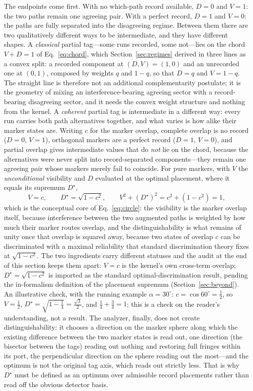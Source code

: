 The endpoints come first. With no which-path record available, $D = 0$ and $V = 1$: the two paths remain one agreeing pair. With a perfect record, $D = 1$ and $V = 0$: the paths are fully separated into the disagreeing regime. Between them there are two qualitatively different ways to be intermediate, and they have different shapes. A \emph{classical} partial tag---some runs recorded, some not---lies on the chord $V + D = 1$ of Eq.~\eqref{eq:chord}, which Section~\ref{sec:regimes} derived in three lines as a convex split: a recorded component at $(D, V) = (1, 0)$ and an unrecorded one at $(0, 1)$, composed by weights $q$ and $1 - q$, so that $D = q$ and $V = 1 - q$. The straight line is therefore not an additional complementarity postulate; it is the geometry of mixing an interference-bearing agreeing sector with a record-bearing disagreeing sector, and it needs the convex weight structure and nothing from the kernel. A \emph{coherent} partial tag is intermediate in a different way: every run carries both path alternatives together, and what varies is how alike their marker states are. Writing $c$ for the marker overlap, complete overlap is no record ($D = 0$, $V = 1$), orthogonal markers are a perfect record ($D = 1$, $V = 0$), and partial overlap gives intermediate values that do \emph{not} lie on the chord, because the alternatives were never split into record-separated components---they remain one agreeing pair whose markers merely fail to coincide. For pure markers, with $V$ the \emph{unconditional} visibility and $D$ evaluated at the optimal placement, where it equals its supremum $D^{\star}$,
\[ V = c, \qquad D^{\star} = \sqrt{1 - c^{2}}, \qquad V^{2} + (D^{\star})^{2} = c^{2} + (1 - c^{2}) = 1, \]
which is the conceptual core of Eq.~\eqref{eq:circle}: the visibility is the marker overlap itself, because interference between the two augmented paths is weighted by how much their marker routes overlap, and the distinguishability is what remains of unity once that overlap is squared away, because two states of overlap $c$ can be discriminated with a maximal reliability that standard discrimination theory fixes at $\sqrt{1 - c^{2}}$. The two ingredients carry different statuses and the audit at the end of this section keeps them apart: $V = c$ is the kernel's own cross-term overlap; $D^{\star} = \sqrt{1 - c^{2}}$ is imported as the standard optimal-discrimination result, pending the in-formalism definition of the placement supremum (Section~\ref{sec:beyond}). An illustrative check, with the running example $\alpha = 30^\circ$: $c = \cos 60^\circ = \tfrac12$, so $V = \tfrac12$, $D^{\star} = \sqrt{1 - \tfrac14} = \tfrac{\sqrt3}{2}$, and $\tfrac14 + \tfrac34 = 1$; this is a check on the reader's understanding, not a result. The analyzer, finally, does not create distinguishability: it chooses a direction on the marker sphere along which the existing difference between the two marker states is read out, one direction (the bisector between the tags) reading out nothing and restoring full fringes within its port, the perpendicular direction on the sphere reading out the most---and the optimum is not the original tag axis, which reads out strictly less. That is why $D^{\star}$ must be defined as an optimum over admissible record placements rather than read off the obvious detector basis.
